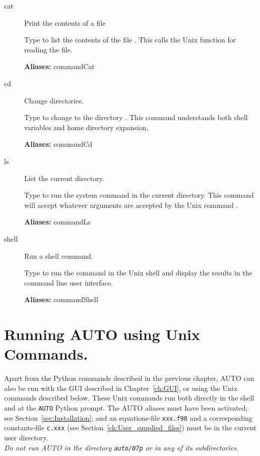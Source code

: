 \documentclass[12pt]{report}
\begin{document}
\begin{description}
\item[cat]
Print the contents of a file

    Type  to list the contents of the file .  This calls the
    Unix function  for reading the file.  
    
\textbf{Aliases:} commandCat

\item[cd]
Change directories.
    
    Type  to change to the directory .  This command
    understands both shell variables and home directory expansion.
    
\textbf{Aliases:} commandCd 

\item[ls]
List the current directory.
    
    Type  to run the system  command in the
    current directory.
    This command will accept whatever arguments are accepted by the Unix command
    .
    
\textbf{Aliases:} commandLs

\item[shell]
Run a shell command.
        
    Type  to run the command 
    in the Unix shell and display
    the results in the \AUTO command line user interface.
    
\textbf{Aliases:} commandShell
\end{description}


\chapter{ Running {\cal AUTO} using Unix Commands.} \label{sec:command_mode}
Apart from the Python commands described in the previous chapter,
{\cal AUTO} can also be run with the GUI described in Chapter~\ref{ch:GUI},
or using the Unix commands described below. These Unix commands run both
directly in the shell and at the {\tt AUTO} Python prompt.
The {\cal AUTO} aliases must have been activated; see Section~\ref{sec:Installation}; 
and an equations-file {\tt xxx.f90} 
and a corresponding constants-file {\tt c.xxx} 
(see Section~\ref{ch:User_supplied_files})
must be in the current user directory.
\\
{\it Do not run {\cal AUTO} in the directory {\tt auto/07p} 
or in any of its subdirectories.}
\end{document}
